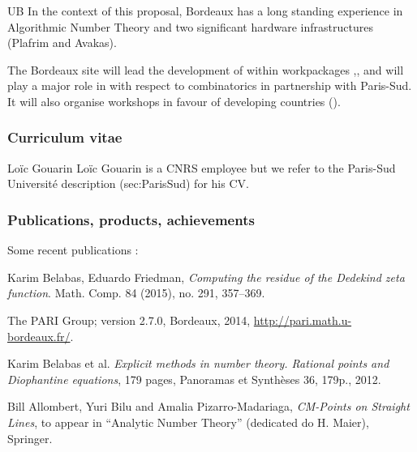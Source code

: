 \begin{sitedescription}{UB}
\medskip
In the context of this proposal, Bordeaux has a long standing experience in
Algorithmic Number Theory and two significant hardware infrastructures
(Plafrim and Avakas).

The Bordeaux site will lead the development of \PariGP within
workpackages ,,  and will play
a major role in  with respect to combinatorics in partnership with Paris-Sud.
It will also organise workshops in favour of developing countries ().

\subsubsection*{Curriculum vitae}







\begin{participant}[type=R,PM=6,gender=male,salary=5600]{Lo\"ic Gouarin}
Lo\"ic Gouarin is a CNRS employee but we refer to the Paris-Sud Universit\'e
description ({sec:ParisSud}) for his CV.
\end{participant}

\subsubsection*{Publications, products, achievements}

Some recent publications :
\begin{compactenum}
\item 
Karim Belabas, Eduardo Friedman,
\textit{Computing the residue of the Dedekind zeta function}.
Math. Comp. 84 (2015), no. 291, 357--369. 

\item
The PARI Group; \PariGP version 2.7.0, Bordeaux, 2014,
\url{http://pari.math.u-bordeaux.fr/}.

\item
Karim Belabas et al.
\textit{Explicit methods in number theory. Rational points and Diophantine equations},
179 pages, Panoramas et Synthèses 36, 179p., 2012.

\item
Bill Allombert, Yuri Bilu and Amalia Pizarro-Madariaga,
\textit{CM-Points on Straight Lines}, to appear in ``Analytic Number Theory'' (dedicated do H. Maier),
Springer.


\end{compactenum}
\end{sitedescription}
